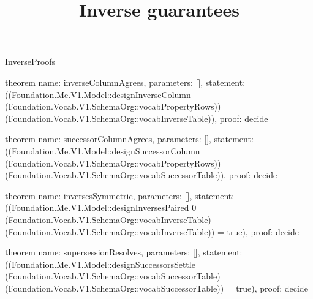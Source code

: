 \begin{lexlean}{InverseProofs}
\title{Inverse guarantees}
\begin{semanticmodule}
theorem{
  name: inverseColumnAgrees,
  parameters: [],
  statement: ((Foundation.Me.V1.Model::designInverseColumn (Foundation.Vocab.V1.SchemaOrg::vocabPropertyRows)) = (Foundation.Vocab.V1.SchemaOrg::vocabInverseTable)),
  proof: decide{}
}

theorem{
  name: successorColumnAgrees,
  parameters: [],
  statement: ((Foundation.Me.V1.Model::designSuccessorColumn (Foundation.Vocab.V1.SchemaOrg::vocabPropertyRows)) = (Foundation.Vocab.V1.SchemaOrg::vocabSuccessorTable)),
  proof: decide{}
}

theorem{
  name: inversesSymmetric,
  parameters: [],
  statement: ((Foundation.Me.V1.Model::designInversesPaired 0 (Foundation.Vocab.V1.SchemaOrg::vocabInverseTable) (Foundation.Vocab.V1.SchemaOrg::vocabInverseTable)) = true),
  proof: decide{}
}

theorem{
  name: supersessionResolves,
  parameters: [],
  statement: ((Foundation.Me.V1.Model::designSuccessorsSettle (Foundation.Vocab.V1.SchemaOrg::vocabSuccessorTable) (Foundation.Vocab.V1.SchemaOrg::vocabSuccessorTable)) = true),
  proof: decide{}
}
\end{semanticmodule}
\end{lexlean}
